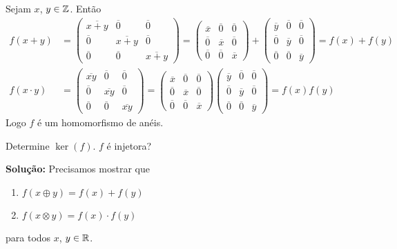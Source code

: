 \documentclass[12pt]{article}
\begin{document}
Sejam $x$, $y \in \mathbb{Z}$. Então
\begin{align*}
	f(x + y) &= \begin{pmatrix}
		\overline{x + y} & \overline{0} & \overline{0}\\
		\overline{0} & \overline{x + y} & \overline{0}\\
		\overline{0} & \overline{0} & \overline{x + y}
	\end{pmatrix} = \begin{pmatrix}
		\overline{x} & \overline{0} & \overline{0}\\
		\overline{0} & \overline{x} & \overline{0}\\
		\overline{0} & \overline{0} & \overline{x}
	\end{pmatrix} + \begin{pmatrix}
		\overline{y} & \overline{0} & \overline{0}\\
		\overline{0} & \overline{y} & \overline{0}\\
		\overline{0} & \overline{0} & \overline{y}
	\end{pmatrix} = f(x) + f(y)\\
	f(x\cdot y) &= \begin{pmatrix}
		\overline{xy} & \overline{0} & \overline{0}\\
		\overline{0} & \overline{xy} & \overline{0}\\
		\overline{0} & \overline{0} & \overline{xy}
	\end{pmatrix} = \begin{pmatrix}
		\overline{x} & \overline{0} & \overline{0}\\
		\overline{0} & \overline{x} & \overline{0}\\
		\overline{0} & \overline{0} & \overline{x}
	\end{pmatrix} \begin{pmatrix}
		\overline{y} & \overline{0} & \overline{0}\\
		\overline{0} & \overline{y} & \overline{0}\\
		\overline{0} & \overline{0} & \overline{y}
	\end{pmatrix} = f(x)f(y)
\end{align*}
Logo $f$ é um homomorfismo de anéis.

\questao Determine $\ker(f)$. $f$ é injetora?

\noindent\textbf{Solu\c{c}\~ao:}
Precisamos mostrar que
\begin{enumerate}[label=({\alph*})]
	\item $f(x \oplus y) = f(x) + f(y)$
	\item $f(x \otimes y) = f(x)\cdot f(y)$
\end{enumerate}
para todos $x$, $y \in \mathbb{R}$.
\end{document}
